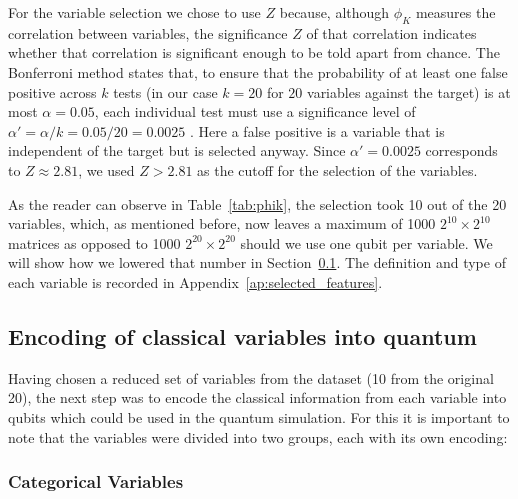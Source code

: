 \documentclass{ieeeaccess}
\begin{document}
For the variable selection we chose to use $Z$ because, although $\phi_{K}$ measures the correlation between variables, the significance $Z$ of that correlation indicates whether that correlation is significant enough to be told apart from chance. The Bonferroni method states that, to ensure that the probability of at least one false positive across $k$ tests (in our case $k = 20$ for $20$ variables against the target) is at most $\alpha = 0.05$, each individual test must use a significance level of $\alpha' = \alpha/k = 0.05/20 = 0.0025$ \cite{bland1995multiple}. Here a false positive is a variable that is independent of the target but is selected anyway. Since $\alpha' = 0.0025$ corresponds to $Z \approx 2.81$, we used $Z > 2.81$ as the cutoff for the selection of the variables.


As the reader can observe in Table~\ref{tab:phik}, the selection took 10 out of the 20 variables, which, as mentioned before, now leaves a maximum of 1000 $2^{10} \times 2^{10}$ matrices as opposed to 1000 $2^{20} \times 2^{20}$ should we use one qubit per variable. We will show how we lowered that number in Section~\ref{subsec:encoding_variables}. The definition and type of each variable is recorded in Appendix~\ref{ap:selected_features}.

\subsection{Encoding of classical variables into quantum}
\label{subsec:encoding_variables}

Having chosen a reduced set of variables from the dataset (10 from the original 20), the next step was to encode the classical information from each variable into qubits which could be used in the quantum simulation. For this it is important to note that the variables were divided into two groups, each with its own encoding:

\subsubsection{Categorical Variables}
\end{document}
